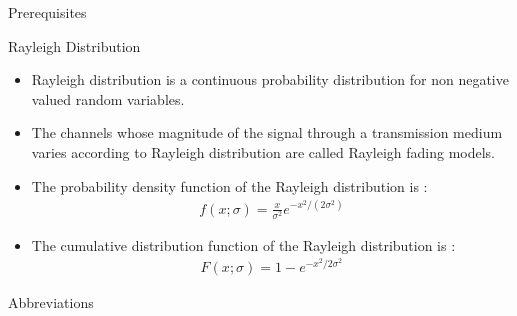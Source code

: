 \documentclass{beamer}
\begin{document}
\begin{frame}{Prerequisites}
 \begin{block}{Rayleigh Distribution}
 \begin{itemize}
 \item Rayleigh distribution is a continuous probability distribution for non negative valued random variables. 
 \item The channels whose magnitude of the signal  through a transmission medium  varies according to Rayleigh distribution are called Rayleigh fading models.
 \item The probability density function of the Rayleigh distribution is :
 \begin{align}
     f(x;\sigma)=\frac{x}{\sigma^2}e^{-x^2/(2\sigma^2)}
 \end{align}
 \item The cumulative distribution function of the Rayleigh distribution is :
 \begin{align}
     F(x;\sigma)=1-e^{-x^2/2\sigma^2}
 \end{align}
 \end{itemize}
 \end{block}   
\end{frame}
\begin{frame}{Abbreviations}
\begin{center}
\begin{table}[h]
    \centering
    \caption{Abbreviations used  in the experiment}
    \label{Abbreviation table}
\end{table}
\end{center}
\end{frame}
\end{document}

